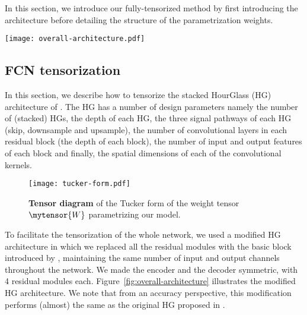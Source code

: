 \documentclass[10pt,twocolumn,letterpaper]{article}
\begin{document}
In this section, we introduce our fully-tensorized method by first introducing the architecture before detailing the structure of the parametrization weights.
\begin{figure*}
    \centering
    \texttt{[image: overall-architecture.pdf]}
    \caption{\textbf{Overall network architecture.} Each block in the fully convolutional network is a basic-block module~\cite{he2016deep} (\emph{blue insert}), containing \emph{b} (by default \(2\)) convolutional layers with \(3\times3\) kernels followed by BatchNorm and ReLU. For all experiments, unless explicitly stated otherwise, we used a stack of \(4\) sub-networks with \(3\) pathways each: downsampling/encoder (red blocks), upsampling/decoder (dark blue) and skip connection (cyan). Yellow dots are element-wise sums.}
    \label{fig:overall-architecture}
\end{figure*}

\subsection{FCN tensorization}

In this section, we describe how to tensorize the stacked HourGlass (HG) architecture of \cite{newell2016stacked}. The HG  has a number of design parameters namely the number of (stacked) HGs, the depth of each HG, the three signal pathways of each HG (skip, downsample and upsample), the number of convolutional layers in each residual block (\myie the depth of each block), the number of input and output features of each block and finally, the spatial dimensions of each of the convolutional kernels. 

\begin{figure}
    \centering
    \texttt{[image: tucker-form.pdf]}
    \caption{\textbf{Tensor diagram} of the Tucker form of the weight tensor \(\mytensor{W}\) parametrizing our model.}
    \label{fig:tucker-form}
    \vspace{-10pt}
\end{figure}


To facilitate the tensorization of the whole network, we used a modified HG architecture in which we replaced all the residual modules with the basic block introduced by \cite{he2016deep}, maintaining the same number of input and output channels throughout the network. We made the encoder and the decoder symmetric, with 4 residual modules each. Figure~\ref{fig:overall-architecture} illustrates the modified HG architecture. We note that from an accuracy perspective, this modification performs (almost) the same as the original HG proposed in \cite{newell2016stacked}.
\end{document}
